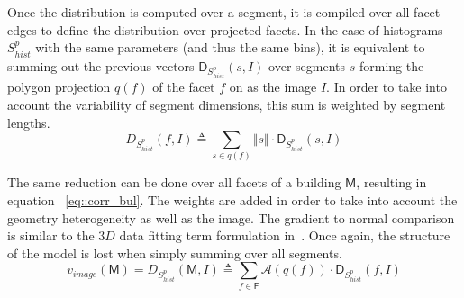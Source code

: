 \documentclass[runningheads]{llncs}
\begin{document}
\begin{figure}
	\begin{center}
	\end{center}
\end{figure}

Once the distribution is computed over a segment, it is compiled over all facet edges to define the distribution over projected facets. In the case of histograms $S_{hist}^p$ with the same parameters (and thus the same bins), it is equivalent to summing out the previous vectors $\mathsf{D}_{S_{hist}^p}(s, I)$ over segments $s$ forming the polygon projection $q(f)$ of the facet $f$ on as the image $I$. In order to take into account the variability of segment dimensions, this sum is weighted by segment lengths.
\begin{equation}
	\label{eq::corr_fac}
	D_{S_{hist}^p}(f, I) \triangleq \sum_{s \in q(f)} \Vert s \Vert \cdot \mathsf{D}_{S_{hist}^p}(s, I)
\end{equation}

The same reduction can be done over all facets of a building $\mathsf{M}$, resulting in equation ~\ref{eq::corr_bul}. The weights are added in order to take into account the geometry heterogeneity as well as the image. The gradient to normal comparison is similar to the $3D$ data fitting term formulation in~\cite{li2016boxfitting}. Once again, the structure of the model is lost when simply summing over all segments.
\begin{equation}
	\label{eq::corr_bul}
	v_{image}(\mathsf{M}) = D_{S_{hist}^p}(\mathsf{M}, I) \triangleq \sum_{f \in \mathsf{F}} \mathscr{A}(q(f)) \cdot \mathsf{D}_{S_{hist}^p}(f, I)
\end{equation}
\end{document}
